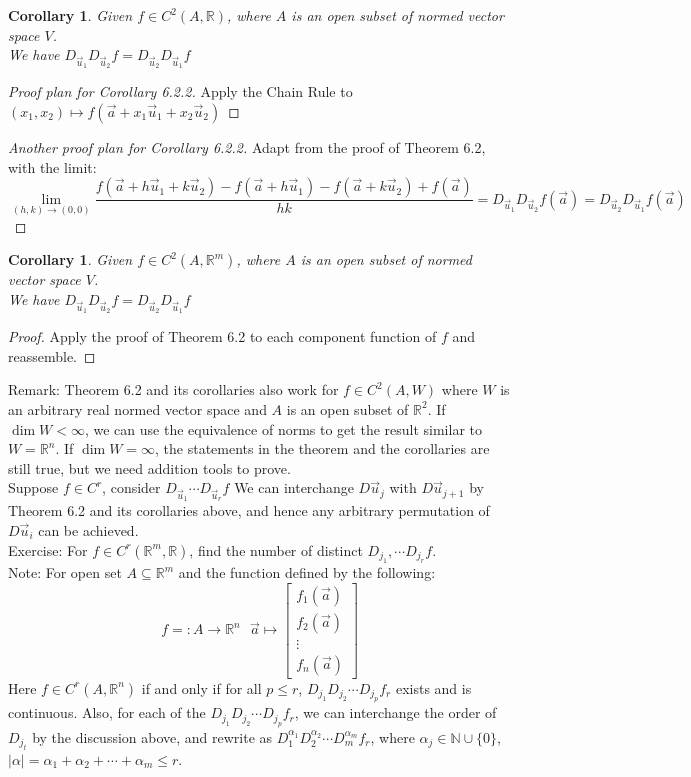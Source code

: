 \documentclass[11pt,oneside]{book}
\theoremstyle{break}
\theoremstyle{break}
\newtheorem{corT}[lem]{Corollary}
\newcommand{\R}{\mathbb{R}}
\newcommand{\N}{\mathbb{N}}
\newcommand{\note}{\color{red}Note: \color{black}}
\newcommand{\remark}{\color{blue}Remark: \color{black}}
\newcommand{\exercise}{\color{green}Exercise: \color{black}}
\begin{document}
\begin{corT}
Given $f\in C^2(A,\R)$, where $A$ is an open subset of normed vector space $V$.\\ We have $D_{\vec{u}_1}D_{\vec{u}_2}f = D_{\vec{u}_2}D_{\vec{u}_1}f$
\end{corT}
\begin{proof}[Proof plan for Corollary 6.2.2]
Apply the Chain Rule to $(x_1,x_2) \mapsto f(\vec{a}+x_1\vec{u}_1+x_2\vec{u}_2)$
\end{proof}
\begin{proof}[Another proof plan for Corollary 6.2.2]
Adapt from the proof of Theorem 6.2, with the limit: $$\lim_{(h,k)\to (0,0)}\frac{f(\vec{a}+h\vec{u}_1+k\vec{u}_2)-f(\vec{a}+h\vec{u}_1)-f(\vec{a}+k\vec{u}_2)+f(\vec{a})}{hk} =D_{\vec{u}_1}D_{\vec{u}_2}f(\vec{a}) = D_{\vec{u}_2}D_{\vec{u}_1}f(\vec{a})$$
\end{proof}

\begin{corT}
Given $f\in C^2(A,\R^m)$, where $A$ is an open subset of normed vector space $V$.\\ We have $D_{\vec{u}_1}D_{\vec{u}_2}f = D_{\vec{u}_2}D_{\vec{u}_1}f$
\end{corT}
\begin{proof}
Apply the proof of Theorem 6.2 to each component function of $f$ and reassemble.
\end{proof}
\remark Theorem 6.2 and its corollaries also work for $f \in C^2(A,W)$ where $W$ is an arbitrary real normed vector space and $A$ is an open subset of $\R^2$. If $\dim W <\infty$, we can use the equivalence of norms to get the result similar to $W = \R^n$. If $\dim W = \infty$, the statements in the theorem and the corollaries are still true, but we need addition tools to prove.\\

Suppose $f\in C^r$, consider $D_{\vec{u}_1}\cdots D_{\vec{u}_r}f$
We can interchange $D\vec{u}_j$ with $D\vec{u}_{j+1}$ by Theorem 6.2 and its corollaries above, and hence any arbitrary permutation of $D\vec{u}_i$ can be achieved. \\

\exercise For $f \in C^r(\R^m,\R)$, find the number of distinct $D_{j_1},\cdots D_{j_r} f$.\\

\note For open set $A\subseteq \R^m$ and the function defined by the following: $$f =: A \to \R^n \ \ \ \vec{a}\mapsto  \begin{bmatrix} f_1(\vec{a})\\f_2(\vec{a})\\\vdots\\f_n (\vec{a})\end{bmatrix}$$ 
Here $f\in C^r(A,\R^n)$ if and only if for all $p\leq r$, $D_{j_1} D_{j_2}\cdots D_{j_p}f_r$ exists and is continuous. Also, for each of the $D_{j_1} D_{j_2}\cdots D_{j_p}f_r$, we can interchange the order of $D_{j_t}$ by the discussion above, and rewrite as $D_1^{\alpha_1}D_2^{\alpha_2}\cdots D_m^{\alpha_m}f_r$, where $\alpha_j \in \N\cup \{0\}$, $|\alpha| = \alpha_1+\alpha_2+\cdots +\alpha_m \leq r$. \\
\end{document}

